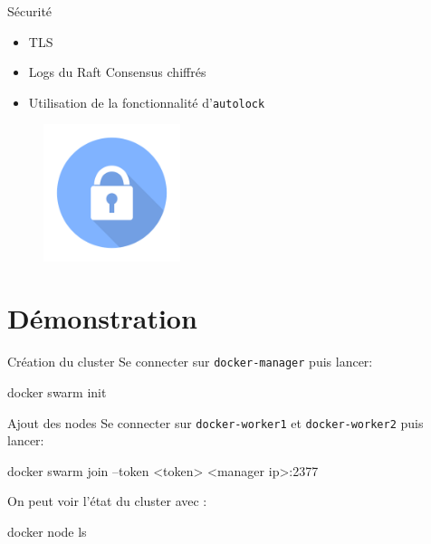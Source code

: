 \documentclass{cubeamer}
\begin{document}
\begin{frame}{Sécurité}

\begin{multicols}{2}

\begin{itemize}
    \item TLS

    \item Logs du Raft Consensus chiffrés

    \item Utilisation de la fonctionnalité d'\verb:autolock:
\end{itemize}

\columnbreak

\begin{figure}
    \centering
    \includegraphics[width=4cm]{img/lock}
\end{figure}

\end{multicols}

\end{frame}

\section{Démonstration}

\begin{frame}[fragile]{Création du cluster}
Se connecter sur \verb:docker-manager: puis lancer:
\begin{bash}
docker swarm init
\end{bash}
\end{frame}

\begin{frame}[fragile]{Ajout des nodes}
Se connecter sur \verb:docker-worker1: et \verb:docker-worker2: puis lancer:
\begin{bash}
docker swarm join --token <token> <manager ip>:2377
\end{bash}

On peut voir l'état du cluster avec :
\begin{bash}
docker node ls
\end{bash}
\end{frame}
\end{document}
